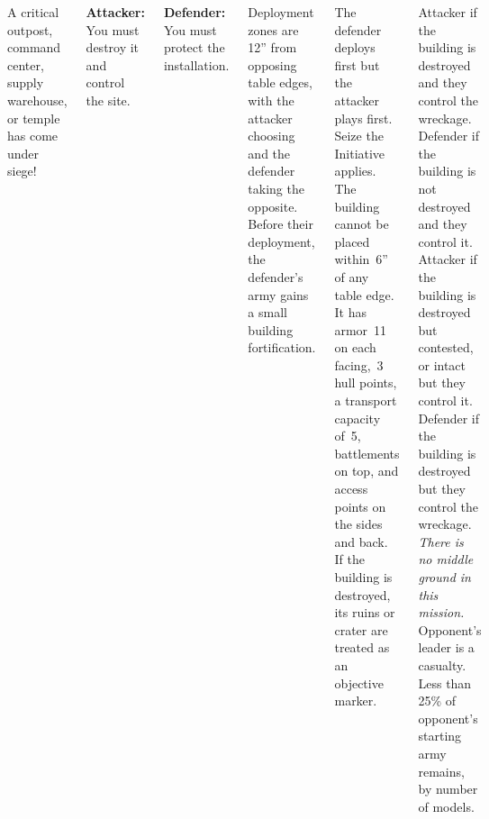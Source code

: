
\begin{columns}

  A critical outpost, command center, supply warehouse, or temple has
  come under siege!

{\bf Attacker:} You must destroy it and control the site.

{\bf Defender:} You must protect the installation.

%

Deployment zones are 12'' from opposing table edges, with the attacker
choosing and the defender taking the opposite.  Before their
deployment, the defender's army gains a small building fortification.

%

The defender deploys first but the attacker plays first.  Seize the
Initiative applies.  The building cannot be placed within~6'' of any
table edge.  It has armor~11 on each facing,~3 hull points, a
transport capacity of~5, battlements on top, and access points on the
sides and back.  If the building is destroyed, its ruins or crater are
treated as an objective marker.



\columnbreak

\scoringbox%
{Attacker if the building is destroyed and they control the wreckage.
  Defender if the building is not destroyed and they control it.}%
{Attacker if the building is destroyed but contested, or intact but
  they control it.  Defender if the building is destroyed but they
  control the wreckage.}%
{\emph{There is no middle ground in this mission.}}%
{Opponent's leader is a casualty.}%
{Less than 25\% of opponent's starting army remains, by
  number of models.}

\end{columns}
